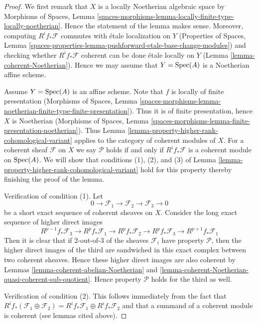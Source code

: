\begin{proof}
We first remark that $X$ is a locally Noetherian algebraic space
by Morphisms of Spaces, Lemma
\ref{spaces-morphisms-lemma-locally-finite-type-locally-noetherian}.
Hence the statement of the lemma makes sense. Moreover, computing
$R^if_*\mathcal{F}$ commutes with \'etale localization on $Y$
(Properties of Spaces, Lemma
\ref{spaces-properties-lemma-pushforward-etale-base-change-modules})
and checking whether $R^if_*\mathcal{F}$ coherent can be done
\'etale locally on $Y$ (Lemma \ref{lemma-coherent-Noetherian}).
Hence we may assume that $Y = \mathop{\mathrm{Spec}}(A)$ is a Noetherian affine scheme.

\medskip\noindent
Assume $Y = \mathop{\mathrm{Spec}}(A)$ is an affine scheme. Note that $f$ is locally
of finite presentation
(Morphisms of Spaces, Lemma
\ref{spaces-morphisms-lemma-noetherian-finite-type-finite-presentation}).
Thus it is of finite presentation, hence $X$ is Noetherian
(Morphisms of Spaces, Lemma
\ref{spaces-morphisms-lemma-finite-presentation-noetherian}).
Thus Lemma \ref{lemma-property-higher-rank-cohomological-variant}
applies to the category of coherent modules of $X$.
For a coherent sheaf $\mathcal{F}$ on $X$ we say $\mathcal{P}$ holds
if and only if $R^if_*\mathcal{F}$ is a coherent module on $\mathop{\mathrm{Spec}}(A)$.
We will show that conditions (1), (2), and (3) of
Lemma \ref{lemma-property-higher-rank-cohomological-variant} hold
for this property thereby finishing the proof of the lemma.

\medskip\noindent
Verification of condition (1). Let
$$
0 \to \mathcal{F}_1 \to \mathcal{F}_2 \to \mathcal{F}_3 \to 0
$$
be a short exact sequence of coherent sheaves on $X$.
Consider the long exact sequence of higher direct images
$$
R^{p - 1}f_*\mathcal{F}_3 \to
R^pf_*\mathcal{F}_1 \to
R^pf_*\mathcal{F}_2 \to
R^pf_*\mathcal{F}_3 \to
R^{p + 1}f_*\mathcal{F}_1
$$
Then it is clear that if 2-out-of-3 of the sheaves $\mathcal{F}_i$
have property $\mathcal{P}$, then the higher direct images of the
third are sandwiched in this exact complex between two coherent
sheaves. Hence these higher direct images are also coherent by
Lemmas \ref{lemma-coherent-abelian-Noetherian} and
\ref{lemma-coherent-Noetherian-quasi-coherent-sub-quotient}.
Hence property $\mathcal{P}$ holds for the third as well.

\medskip\noindent
Verification of condition (2). This follows immediately from the fact
that $R^if_*(\mathcal{F}_1 \oplus \mathcal{F}_2) =
R^if_*\mathcal{F}_1 \oplus R^if_*\mathcal{F}_2$ and that a summand
of a coherent module is coherent (see lemmas cited above).


\end{proof}
